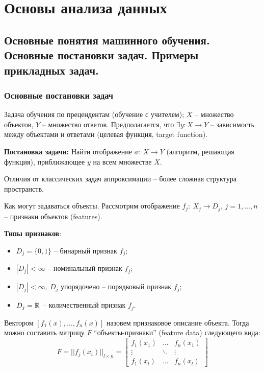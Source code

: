 \chapter{Основы анализа данных}

%

\begin{multicols}{2}
    \raggedcolumns
    \section{Основные понятия машинного обучения. Основные постановки задач. Примеры
    прикладных задач.}
    \subsection*{Основные постановки задач}
    Задача обучения по прецендентам (обучение с учителем);
    $X$ -- множество объектов, $Y$ -- множество ответов. Предполагается, что $\exists y: X \to Y$ -- зависимость между объектами и ответами (целевая функция, target function).
    \par
    \textbf{Постановка задачи: } Найти отображение \mbox{$a: \ X\to Y$} (алгоритм, решающая функция), приближающее $y$ на всем множестве $X$.
    \par 
    Отличия от классических задач аппроксимации -- более сложная структура пространств. 
    \bigskip\par
    Как могут задаваться объекты. Рассмотрим отображение \mbox{$f_j: \ X_j \to D_j$}, \mbox{$j = 1, \ldots, n$} -- признаки объектов (features).
    \par \textbf{Типы признаков}:
    \begin{itemize}
      \item[] $D_j = \{0, 1\}$ -- бинарный признак $f_j$;
      \item[] $|D_j| < \infty$ -- номинальный признак $f_j$;
      \item[] $|D_j| < \infty, \ D_j$ упорядочено -- порядковый признак $f_j$;
      \item[] $D_j = \mathbb{R}$ -- количественный признак $f_j$.
    \end{itemize}
    Вектором $[f_1(x), \ldots, f_n(x)]$ назовем признаковое описание объекта. Тогда можно составить матрицу $F$ ``объекты-признаки'' (feature data) следующего вида:
    \[
        F = \big|\big|f_j(x_i)\big|\big|_{l\times n} = \begin{bmatrix}
          f_1(x_1) & \ldots & f_n(x_1)\\
          \vdots & \ddots & \vdots\\
          f_1(x_l) & \ldots & f_n(x_l)
        \end{bmatrix}      
    \]

\end{multicols}
